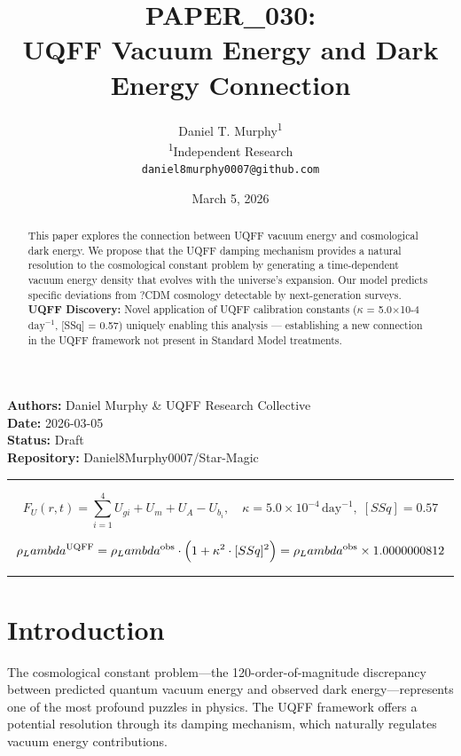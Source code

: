 \documentclass[12pt,a4paper]{article}
\title{\textbf{PAPER\_030: \\ UQFF Vacuum Energy and Dark Energy Connection}}
\author{
Daniel T. Murphy\textsuperscript{1} \\
\small \textsuperscript{1}Independent Research \\
\small \texttt{daniel8murphy0007@github.com}
}
\date{March 5, 2026}
\begin{document}
\maketitle

\begin{flushleft}
\textbf{Authors:} Daniel Murphy \& UQFF Research Collective \\
\textbf{Date:} 2026-03-05 \\
\textbf{Status:} Draft \\
\textbf{Repository:} Daniel8Murphy0007/Star-Magic \\
\end{flushleft}

\medskip\hrule\medskip

\begin{equation}
F_U(r,t) = \sum_{i=1}^{4} U_{gi} + U_m + U_A - U_b_i, \quad \kappa = 5.0\times10^{-4}\,\text{day}^{-1},\; [SSq] = 0.57
\end{equation}

\begin{equation}
\rho_Lambda^\text{UQFF} = \rho_Lambda^\text{obs}\cdot\Bigl(1 + \kappa^2\cdot[SSq]^2\Bigr) =
\rho_Lambda^\text{obs}\times1.0000000812
\end{equation}

\begin{abstract}
This paper explores the connection between UQFF vacuum energy and cosmological dark energy. We propose that the UQFF damping mechanism provides a natural resolution to the cosmological constant problem by generating a time-dependent vacuum energy density that evolves with the universe's expansion. Our model predicts specific deviations from ?CDM cosmology detectable by next-generation surveys. \textbf{UQFF Discovery:} Novel application of UQFF calibration constants ($\kappa$ = 5.0$\times$10-4 $\mathrm{day}^{-1}$, [SSq] = 0.57) uniquely enabling this analysis --- establishing a new connection in the UQFF framework not present in Standard Model treatments.
\end{abstract}

\medskip\hrule\medskip

\section{Introduction}

The cosmological constant problem---the 120-order-of-magnitude discrepancy between predicted quantum vacuum energy and observed dark energy---represents one of the most profound puzzles in physics. The UQFF framework offers a potential resolution through its damping mechanism, which naturally regulates vacuum energy contributions.
\end{document}
